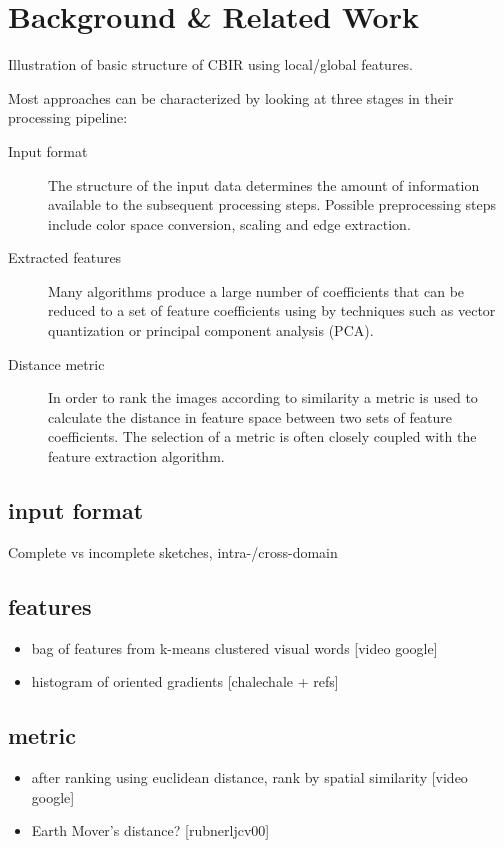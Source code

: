 \chapter{Background \& Related Work}\label{ch:background}

Illustration of basic structure of CBIR using local/global features.

Most approaches can be characterized by looking at three stages in their processing pipeline:

\begin{description}
    \item[Input format] The structure of the input data determines the amount of information available to the subsequent processing steps. Possible preprocessing steps include color space conversion, scaling and edge extraction.
    \item[Extracted features] Many algorithms produce a large number of coefficients that can be reduced to a set of feature coefficients using by techniques such as vector quantization or principal component analysis (PCA).
    \item[Distance metric] In order to rank the images according to similarity a metric is used to calculate the distance in feature space between two sets of feature coefficients. The selection of a metric is often closely coupled with the feature extraction algorithm.
\end{description}

\section{input format}
Complete vs incomplete sketches, intra-/cross-domain

\section{features}

\begin{itemize}
    \item bag of features from k-means clustered visual words [video google]
    \item histogram of oriented gradients [chalechale + refs]
\end{itemize}

\section{metric}

\begin{itemize}
    \item after ranking using euclidean distance, rank by spatial similarity [video google]
    \item Earth Mover's distance? [rubnerljcv00]
\end{itemize}

